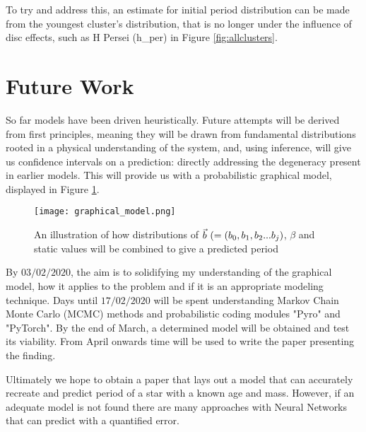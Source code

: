 \documentclass[fleqn,usenatbib]{mnras}
\begin{document}
{To try and address this, an estimate for initial period distribution can be made from the youngest cluster's distribution, that is no longer under the influence of disc effects, such as H Persei (h\_per) in Figure \ref{fig:allclusters}.

\section{Future Work}
So far models have been driven heuristically.
Future attempts will be derived from first principles, meaning they will be drawn from fundamental distributions rooted in a physical understanding of the system, and, using inference, will give us confidence intervals on a prediction: directly addressing the degeneracy present in earlier models.
This will provide us with a probabilistic graphical model, displayed in Figure \ref{fig:graphical_model}.

\begin{figure}
	\texttt{[image: graphical\_model.png]}
	\caption{An illustration of how distributions of $\protect\vec{b}~(= (b_0, b_1, b_2...b_j)$, $\beta$ and static values will be combined to give a predicted period}
	\label{fig:graphical_model}
\end{figure}

By $03/02/2020$, the aim is to solidifying my understanding of the graphical model, how it applies to the problem and if it is an appropriate modeling technique.
Days until $17/02/2020$ will be spent understanding Markov Chain Monte Carlo (MCMC) methods and probabilistic coding modules "Pyro" and "PyTorch".
By the end of March, a determined model will be obtained and test its viability.
From April onwards time will be used to write the paper presenting the finding.

Ultimately we hope to obtain a paper that lays out a model that can accurately recreate and predict period of a star with a known age and mass.
However, if an adequate model is not found there are many approaches with Neural Networks that can predict with a quantified error.

 
}
\end{document}
